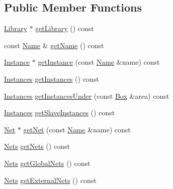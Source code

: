 \subsection*{Public Member Functions}
\begin{DoxyCompactItemize}
\item 
\mbox{\hyperlink{classHurricane_1_1Library}{Library}} $\ast$ \mbox{\hyperlink{classHurricane_1_1Cell_aa84b97773160a28d3dd69df1e261eecf}{get\+Library}} () const
\item 
const \mbox{\hyperlink{classHurricane_1_1Name}{Name}} \& \mbox{\hyperlink{classHurricane_1_1Cell_a01cd4bba972d484496fd297648b8fa0c}{get\+Name}} () const
\item 
\mbox{\hyperlink{classHurricane_1_1Instance}{Instance}} $\ast$ \mbox{\hyperlink{classHurricane_1_1Cell_abaf178b24734de37cf0ac31918c096ac}{get\+Instance}} (const \mbox{\hyperlink{classHurricane_1_1Name}{Name}} \&name) const
\item 
\mbox{\hyperlink{namespaceHurricane_ac9436b03a2926f34ad6863deae2baadc}{Instances}} \mbox{\hyperlink{classHurricane_1_1Cell_aa85b3992431b672827167c5d9cb622f2}{get\+Instances}} () const
\item 
\mbox{\hyperlink{namespaceHurricane_ac9436b03a2926f34ad6863deae2baadc}{Instances}} \mbox{\hyperlink{classHurricane_1_1Cell_a5eb16d9d0f340ad71b81d794f6f8525f}{get\+Instances\+Under}} (const \mbox{\hyperlink{classHurricane_1_1Box}{Box}} \&area) const
\item 
\mbox{\hyperlink{namespaceHurricane_ac9436b03a2926f34ad6863deae2baadc}{Instances}} \mbox{\hyperlink{classHurricane_1_1Cell_a7e51bee5db73dd44f788e591a5c175c8}{get\+Slave\+Instances}} () const
\item 
\mbox{\hyperlink{classHurricane_1_1Net}{Net}} $\ast$ \mbox{\hyperlink{classHurricane_1_1Cell_a63cb19881279b5af0a4e7dae707ef1bd}{get\+Net}} (const \mbox{\hyperlink{classHurricane_1_1Name}{Name}} \&name) const
\item 
\mbox{\hyperlink{namespaceHurricane_a3404a8b17130a1824f4a281704b04df7}{Nets}} \mbox{\hyperlink{classHurricane_1_1Cell_a8b4728abe83e9ec21d7bee1154218279}{get\+Nets}} () const
\item 
\mbox{\hyperlink{namespaceHurricane_a3404a8b17130a1824f4a281704b04df7}{Nets}} \mbox{\hyperlink{classHurricane_1_1Cell_a1512722d821edc18ff38e673862cd108}{get\+Global\+Nets}} () const
\item 
\mbox{\hyperlink{namespaceHurricane_a3404a8b17130a1824f4a281704b04df7}{Nets}} \mbox{\hyperlink{classHurricane_1_1Cell_aa80f3345db8c1395fa04a50737208793}{get\+External\+Nets}} () const

\end{DoxyCompactItemize}
